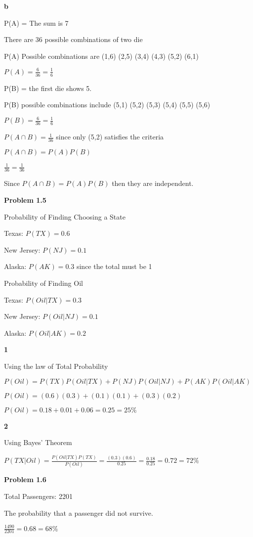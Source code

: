 \documentclass[12pt, letterpaper]{article}
\begin{document}
\textbf{b}

P(A) = The sum is 7

There are 36 possible combinations of two die

P(A) Possible combinations are (1,6) (2,5) (3,4) (4,3) (5,2) (6,1)

$P(A) = \frac{6}{36} = \frac{1}{6}$

P(B) = the first die shows 5.

P(B) possible combinations include (5,1) (5,2) (5,3) (5,4) (5,5) (5,6)

$P(B) = \frac{6}{36} = \frac{1}{6}$

$P(A \cap B) = \frac{1}{36}$ since only (5,2) satisfies the criteria

$P(A \cap B) = P(A)P(B)$

$\frac{1}{36} = \frac{1}{36}$

Since $P(A \cap B) = P(A)P(B)$ then they are independent.

\textbf{Problem 1.5}

Probability of Finding Choosing a State

Texas: $P(TX) = 0.6$

New Jersey: $P(NJ) = 0.1$

Alaska: $P(AK) = 0.3$ since the total must be 1

Probability of Finding Oil

Texas: $P(Oil|TX) = 0.3$

New Jersey: $P(Oil|NJ) = 0.1$

Alaska: $P(Oil|AK) = 0.2$

\textbf{1}

Using the law of Total Probability

$P(Oil) = P(TX)P(Oil|TX) + P(NJ)P(Oil|NJ) + P(AK)P(Oil|AK)$

$P(Oil) = (0.6)(0.3)     + (0.1)(0.1)     + (0.3)(0.2)$

$P(Oil) = 0.18           + 0.01           + 0.06 = 0.25 = 25\%$

\textbf{2}

Using Bayes' Theorem

$P(TX|Oil) = \frac{P(Oil|TX)P(TX)}{P(Oil)} = \frac{(0.3)(0.6)}{0.25} = \frac{0.18}{0.25} = 0.72 = 72\%$

\textbf{Problem 1.6}

Total Passengers: 2201

The probability that a passenger did not survive.

$\frac{1490}{2201} = 0.68 = 68\%$
\end{document}
